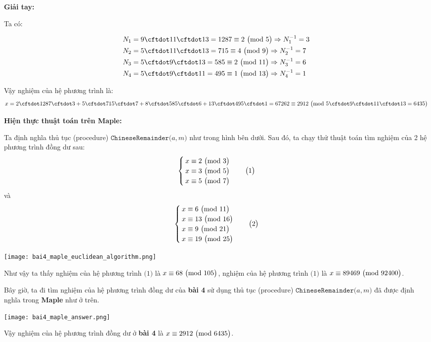 \textbf{Giải tay:}

Ta có:
\begin{ceqn}
\begin{align*}
N_1 &= 9 \cftdot 11 \cftdot 13 = 1287 \equiv 2 \Mod{5} \Rightarrow N_1^{-1} = 3\\
N_2 &= 5 \cftdot 11 \cftdot 13 = 715 \equiv 4 \Mod{9} \Rightarrow N_2^{-1} = 7\\
N_3 &= 5 \cftdot 9 \cftdot 13 = 585 \equiv 2 \Mod{11} \Rightarrow N_3^{-1} = 6\\
N_4 &= 5 \cftdot 9 \cftdot 11 = 495 \equiv 1 \Mod{13} \Rightarrow N_4^{-1} = 1
\end{align*}
\end{ceqn}

Vậy nghiệm của hệ phương trình là:
$$x = 2 \cftdot 1287 \cftdot 3 + 5 \cftdot 715 \cftdot 7 + 8 \cftdot 585 \cftdot 6 + 13 \cftdot 495 \cftdot 1 = 67262 \equiv 2912 \Mod{5 \cftdot 9 \cftdot 11 \cftdot 13 = 6435}$$

\textbf{Hiện thực thuật toán trên Maple:}

Ta định nghĩa thủ tục (procedure) $\mathtt{ChineseRemainder} \big( a, m \big)$ như trong hình bên dưới. Sau đó, ta chạy thử thuật toán tìm nghiệm của 2 hệ phương trình đồng dư sau:
$$ \begin{cases}
    x \equiv 2 \ \big( \mathrm{mod}\ 3 \big)\\
    x \equiv 3 \ \big( \mathrm{mod}\ 5 \big)\\
    x \equiv 5 \ \big( \mathrm{mod}\ 7 \big)
\end{cases} \quad \big( 1 \big) $$
và
$$ \begin{cases}
    x \equiv 6 \ \big( \mathrm{mod}\ 11 \big)\\
    x \equiv 13 \ \big( \mathrm{mod}\ 16 \big)\\
    x \equiv 9 \ \big( \mathrm{mod}\ 21 \big)\\
    x \equiv 19 \ \big( \mathrm{mod}\ 25 \big)
\end{cases} \quad \big( 2 \big) $$

\texttt{[image: bai4\_maple\_euclidean\_algorithm.png]}

Như vậy ta thấy nghiệm của hệ phương trình $\big( 1 \big)$ là $x \equiv 68\ \big( \mathrm{mod}\ 105 \big)$, nghiệm của hệ phương trình $\big( 1 \big)$ là $x \equiv 89469\ \big( \mathrm{mod}\ 92400 \big)$.

Bây giờ, ta đi tìm nghiệm của hệ phương trình đồng dư của \textbf{bài 4} sử dụng thủ tục (procedure) $\mathtt{ChineseRemainder} \big( a, m \big)$ đã được định nghĩa trong \textbf{Maple} như ở trên.

\texttt{[image: bai4\_maple\_answer.png]}

Vậy nghiệm của hệ phương trình đồng dư ở \textbf{bài 4} là $x \equiv 2912\ \big( \mathrm{mod}\ 6435 \big)$.
	
\clearpage